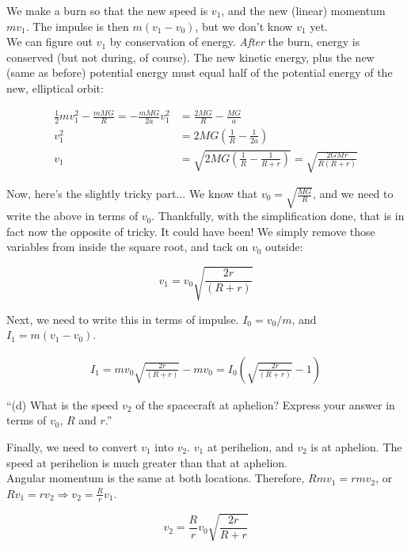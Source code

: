 \documentclass[8.01x]{subfiles}
\begin{document}
We make a burn so that the new speed is $v_1$, and the new (linear) momentum $m v_1$. The impulse is then $m(v_1 - v_0)$, but we don't know $v_1$ yet.\\
We can figure out $v_1$ by conservation of energy. \emph{After} the burn, energy is conserved (but not during, of course). The new kinetic energy, plus the new (same as before) potential energy must equal half of the potential energy of the new, elliptical orbit:

\begin{align}
\frac{1}{2} m v_1^2 - \frac{m M G}{R} = -\frac{m M G}{2a}
v_1^2 &= \frac{2 M G}{R} - \frac{M G}{a}\\
v_1^2 &= 2 M G\left(\frac{1}{R} - \frac{1}{2a}\right)\\
v_1   &= \sqrt{2 M G\left(\frac{1}{R} - \frac{1}{R + r}\right)} = \sqrt{\frac{2 G M r}{R(R + r)}}
\end{align}

Now, here's the slightly tricky part... We know that $\displaystyle v_0 = \sqrt{\frac{M G}{R}}$, and we need to write the above in terms of $v_0$. Thankfully, with the simplification done, that is in fact now the opposite of tricky. It could have been! We simply remove those variables from inside the square root, and tack on $v_0$ outside:

\begin{equation}
v_1 = v_0 \sqrt{\frac{2 r}{(R + r)}}
\end{equation}

Next, we need to write this in terms of impulse. $I_0 = v_0/m$, and $I_1 = m(v_1 - v_0)$.

\begin{align}
I_1 = m v_0 \sqrt{\frac{2 r}{(R + r)}} - m v_0 = I_0 \left(\sqrt{\frac{2 r}{(R + r)}} - 1\right)
\end{align}

``(d) What is the speed $v_2$ of the spacecraft at aphelion? Express your answer in terms of $v_0$, $R$ and $r$.''

Finally, we need to convert $v_1$ into $v_2$. $v_1$ at perihelion, and $v_2$ is at aphelion. The speed at perihelion is much greater than that at aphelion.\\
Angular momentum is the same at both locations. Therefore, $R m v_1 = r m v_2$, or $R v_1 = r v_2 \Rightarrow v_2 = \frac{R}{r} v_1$.

\begin{equation}
v_2 = \frac{R}{r} v_0 \sqrt{\frac{2r}{R + r}}
\end{equation}
\end{document}
